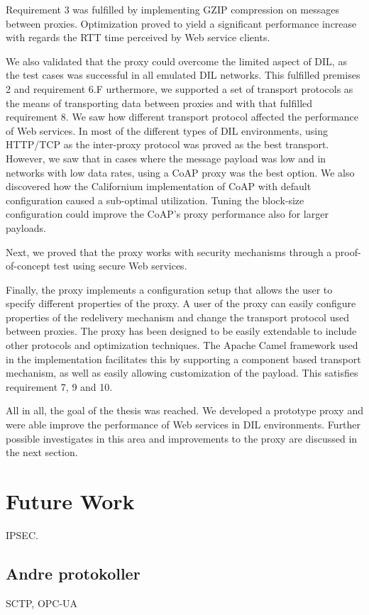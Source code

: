 Requirement 3 was fulfilled by implementing GZIP compression on messages between
proxies. Optimization proved to yield a significant performance increase with
regards the RTT time perceived by Web service clients.

We also validated that the proxy could overcome the limited aspect of DIL, as
the test cases was successful in all emulated DIL networks. This fulfilled
premises 2 and requirement 6.F urthermore, we supported a set of transport
protocols as the means of transporting data between proxies and with that
fulfilled requirement 8. We saw how different transport protocol affected the
performance of Web services. In most of the different types of DIL environments,
using HTTP/TCP as the inter-proxy protocol was proved as the best transport.
However, we saw that in cases where the message payload was low and in networks
with low data rates, using a CoAP proxy was the best option. We also discovered
how the Californium implementation of CoAP with default configuration caused a
sub-optimal utilization. Tuning the block-size configuration could improve the
CoAP's proxy performance also for larger payloads.

Next, we proved that the proxy works with security mechanisms through a
proof-of-concept test using secure Web services.

Finally, the proxy implements a configuration setup that allows the user to
specify different properties of the proxy. A user of the proxy can easily
configure properties of the redelivery mechanism and change the transport
protocol used between proxies. The proxy has been designed to be easily
extendable to include other protocols and optimization techniques. The Apache
Camel framework used in the implementation facilitates this by supporting a
component based transport mechanism, as well as easily allowing customization of
the payload. This satisfies requirement 7, 9 and 10.


All in all, the goal of the thesis was reached. We developed a prototype proxy
and were able improve the performance of Web services in DIL environments.
Further possible investigates in this area and improvements to the proxy are
discussed in the next section.


\section{Future Work}
IPSEC.

\subsection{Andre protokoller}
SCTP, OPC-UA

